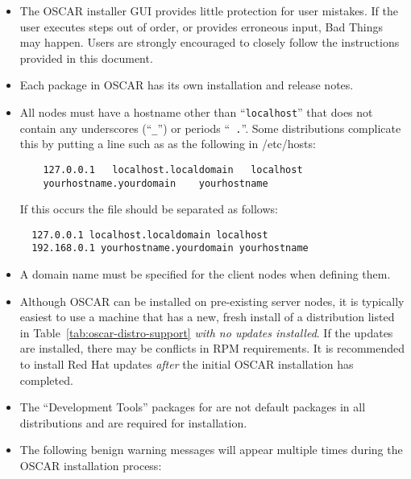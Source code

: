 \begin{itemize}

\item The OSCAR installer GUI provides little protection for user
  mistakes.  If the user executes steps out of order, or provides
  erroneous input, Bad Things may happen.  Users are strongly
  encouraged to closely follow the instructions provided in this
  document.

\item Each package in OSCAR has its own installation and release
  notes.   

\begchange
\item All nodes must have a hostname other than ``{\tt localhost}''
  that does not contain any underscores (``{\tt \_}'') or periods ``{\tt
  .}''.  Some distributions complicate this by putting a line such
  as as the following in /etc/hosts:
  \begin{verbatim}
    127.0.0.1   localhost.localdomain   localhost
    yourhostname.yourdomain    yourhostname
  \end{verbatim}
  If this occurs the file should be separated as follows:
  \begin{verbatim}
  127.0.0.1 localhost.localdomain localhost
  192.168.0.1 yourhostname.yourdomain yourhostname
  \end{verbatim}
\endchange

\item A domain name must be specified for the client nodes when
  defining them.

\item Although OSCAR can be installed on pre-existing server nodes, it
  is typically easiest to use a machine that has a new, fresh install
  of a distribution listed in Table~\ref{tab:oscar-distro-support}
  {\em with no updates installed}.  If the updates are installed,
  there may be conflicts in RPM requirements.  It is recommended to
  install Red Hat updates {\em after} the initial OSCAR installation has
  completed.

\item The ``Development Tools'' packages for are not default packages in
all distributions and are required for installation.

\item The following benign warning messages will appear multiple times
  during the OSCAR installation process:


\end{itemize}
